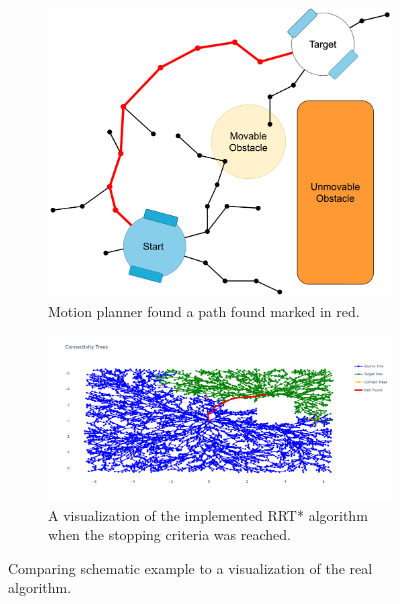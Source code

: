 \begin{figure}[H]
    \centering
    \begin{subfigure}{0.5\textwidth}
    \centering
    \includegraphics[width=1.10\textwidth]{figures/required_background/mp/7mp_path_found.drawio.png}
    \caption{Motion planner found a path found marked in red.}
    \end{subfigure}%

    \begin{subfigure}{\textwidth}
    \hspace{-0.7cm}
    \includegraphics[width=1.1\textwidth]{figures/required_background/mp/mp_the_real_deal.png}
    \caption{A visualization of the implemented \acs{RRT*} algorithm\\when the stopping criteria was reached.}
    \end{subfigure}
    \label{fig:motion_planner_comparison}%
    \caption{Comparing schematic example to a visualization of the real algorithm.}
\end{figure}

